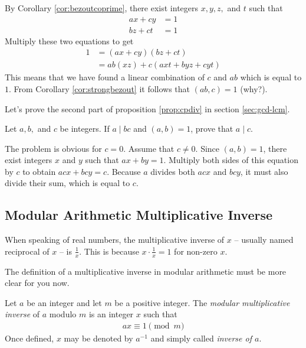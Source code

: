 \documentclass{subfile}
\begin{document}
	\begin{solution}
		By Corollary \ref{cor:bezoutcoprime}, there exist integers $x,y,z,$ and $t$ such that
			\begin{align*}
				ax+cy&=1\\
				bz+ct&=1
			\end{align*}
		Multiply these two equations to get
			\begin{align*}
				1 &= (ax+cy)(bz+ct)\\
				  &= ab(xz)+c(axt+byz+cyt)
			\end{align*}
		This means that we have found a linear combination of $c$ and $ab$ which is equal to $1$. From Corollary \ref{cor:strongbezout} it follows that $(ab,c)=1$ (why?).
	\end{solution}

	Let's prove the second part of proposition \eqref{prop:cpdiv} in section \eqref{sec:gcd-lcm}.

	\begin{problem}\label{prob:a|bc}
		Let $a,b,$ and $c$ be integers. If $a\mid bc$ and $(a,b)=1$, prove that $a\mid c$.
	\end{problem}

	\begin{solution}
		The problem is obvious for $c=0$. Assume that $c \neq 0$. Since $(a,b)=1$, there exist integers $x$ and $y$ such that $ax+by=1$. Multiply both sides of this equation by $c$ to obtain $acx+bcy=c$. Because $a$ divides both $acx$ and $bcy$, it must also divide their sum, which is equal to $c$.

	\end{solution}

	\subsection{Modular Arithmetic Multiplicative Inverse}\label{sec:arithinverse}

	When speaking of real numbers, the multiplicative inverse of $x$ -- usually named reciprocal of $x$ -- is $\frac{1}{x}$. This is because $x \cdot \frac{1}{x} = 1$ for non-zero $x$.

	The definition of a multiplicative inverse in modular arithmetic must be more clear for you now.

	\begin{definition}
		Let $a$ be an integer and let $m$ be a positive integer. The \textit{modular multiplicative inverse} of $a$ modulo $m$ is an integer $x$ such that
		\begin{align*}
		ax \equiv 1 \pmod m
		\end{align*}
		Once defined, $x$ may be denoted by $a^{-1}$ and simply called \textit{inverse of $a$}.
	\end{definition}
\end{document}
